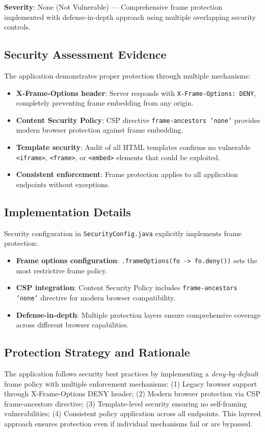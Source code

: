 \documentclass[]{UCD_CS_FYP_Report}
\begin{document}
\textbf{Severity}: None (Not Vulnerable) — Comprehensive frame protection implemented with defense-in-depth approach using multiple overlapping security controls.

\subsection{Security Assessment Evidence}
The application demonstrates proper protection through multiple mechanisms:
\begin{itemize}
	\item \textbf{X-Frame-Options header}: Server responds with \texttt{X-Frame-Options: DENY}, completely preventing frame embedding from any origin.
	\item \textbf{Content Security Policy}: CSP directive \texttt{frame-ancestors 'none'} provides modern browser protection against frame embedding.
	\item \textbf{Template security}: Audit of all HTML templates confirms no vulnerable \texttt{<iframe>}, \texttt{<frame>}, or \texttt{<embed>} elements that could be exploited.
	\item \textbf{Consistent enforcement}: Frame protection applies to all application endpoints without exceptions.
\end{itemize}

\subsection{Implementation Details}
Security configuration in \texttt{SecurityConfig.java} explicitly implements frame protection:
\begin{itemize}
	\item \textbf{Frame options configuration}: \texttt{.frameOptions(fo -> fo.deny())} sets the most restrictive frame policy.
	\item \textbf{CSP integration}: Content Security Policy includes \texttt{frame-ancestors 'none'} directive for modern browser compatibility.
	\item \textbf{Defense-in-depth}: Multiple protection layers ensure comprehensive coverage across different browser capabilities.
\end{itemize}

\subsection{Protection Strategy and Rationale}
The application follows security best practices by implementing a \textit{deny-by-default} frame policy with multiple enforcement mechanisms: (1) Legacy browser support through X-Frame-Options DENY header; (2) Modern browser protection via CSP frame-ancestors directive; (3) Template-level security ensuring no self-framing vulnerabilities; (4) Consistent policy application across all endpoints. This layered approach ensures protection even if individual mechanisms fail or are bypassed.
\end{document}

